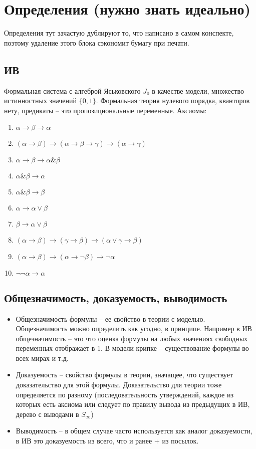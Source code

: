\section{Определения (нужно знать идеально)}
\label{sec-2}
Определения тут зачастую дублируют то, что написано в самом
конспекте, поэтому удаление этого блока сэкономит бумагу при
печати.
\subsection{ИВ}
\label{sec-2-1}
Формальная система с алгеброй Яськовского $J_{0}$ в качестве модели, множество истинностных значений $\lbrace0, 1\rbrace$.
Формальная теория нулевого порядка, кванторов нету, предикаты -- это пропозициональные переменные.
Аксиомы:
\begin{enumerate}
\item $\alpha \to \beta \to \alpha$
\item $(\alpha \to \beta) \to (\alpha \to \beta \to \gamma) \to (\alpha \to \gamma)$
\item $\alpha \to \beta \to \alpha \& \beta$
\item $\alpha \& \beta \to \alpha$
\item $\alpha \& \beta \to \beta$
\item $\alpha \to \alpha \lor \beta$
\item $\beta \to \alpha \lor \beta$
\item $(\alpha \to \beta) \to (\gamma \to \beta) \to (\alpha \lor \gamma \to \beta)$
\item $(\alpha \to \beta) \to (\alpha \to \lnot \beta) \to \lnot \alpha$
\item $\lnot \lnot \alpha \to \alpha$
\end{enumerate}
\subsection{Общезначимость, доказуемость, выводимость}
\label{sec-2-2}
\begin{itemize}
\item Общезначимость формулы -- ее свойство в теории с моделью.
Общезначимость можно определить как угодно, в принципе.
Например в ИВ общезначимость -- это что оценка формулы на любых значениях свободных переменных отображает в 1.
В модели крипке -- существование формулы во всех мирах и т.д.
\item Доказуемость -- свойство формулы в теории, значащее, что существует
доказательство для этой формулы. Доказательство для теории тоже определяется
по разному (последовательность утверждений, каждое из которых есть аксиома
или следует по правилу вывода из предыдущих в ИВ, дерево с выводами в $S_{\infty}$)
\item Выводимость -- в общем случае часто используется как аналог доказуемости,
в ИВ это доказуемость из всего, что и ранее + из посылок.
\end{itemize}

